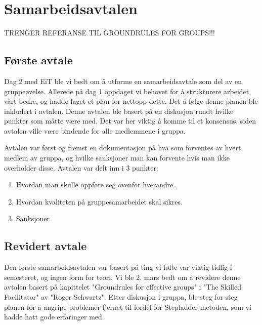 \section{Samarbeidsavtalen}

TRENGER REFERANSE TIL GROUNDRULES FOR GROUPS!!!

\subsection{Første avtale}
Dag 2 med EiT ble vi bedt om å utforme en samarbeidsavtale som del av en 
gruppeøvelse. Allerede på dag 1 oppdaget vi behovet for å strukturere arbeidet
vårt bedre, og hadde laget et plan for nettopp dette. Det å følge denne planen
ble inkludert i avtalen. Denne avtalen ble basert på en diskusjon rundt hvilke
punkter som måtte være med. Det var her viktig å komme til et konsensus, siden
avtalen ville være bindende for alle medlemmene i gruppa.

Avtalen var først og fremst en dokumentasjon på hva som forventes av hvert
medlem av gruppa, og hvilke sanksjoner man kan forvente hvis man ikke
overholder disse. Avtalen var delt inn i 3 punkter: 
\begin{enumerate}
	\item Hvordan man skulle oppføre seg ovenfor hverandre.
	\item Hvordan kvaliteten på gruppesamarbeidet skal sikres.
	\item Sanksjoner.
\end{enumerate}

\subsection{Revidert avtale}
Den første samarbeidsavtalen var basert på ting vi følte var viktig tidlig i semesteret, og ingen form for teori.
Vi ble 2. mars bedt om å revidere denne avtalen basert på kapittelet "Groundrules for effective groups" i "The Skilled Facilitator" av "Roger Schwartz".
Etter diskusjon i gruppa, ble steg for steg planen for å angripe problemer fjernet til fordel for Stepladder-metoden, som vi hadde hatt gode erfaringer med.
